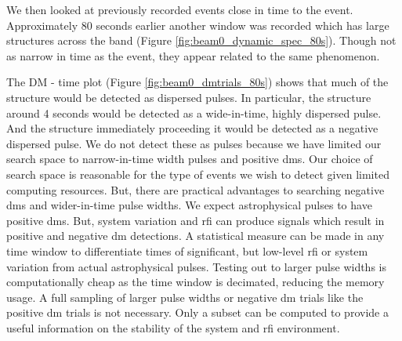 \documentclass[a4paper,fleqn,usenatbib]{mnras}
\begin{document}
We then looked at previously recorded events close in time to the event.
Approximately 80 seconds earlier another window was recorded which has large
structures across the band (Figure \ref{fig:beam0_dynamic_spec_80s}). Though not
as narrow in time as the event, they appear related to the same phenomenon.

The DM - time plot (Figure \ref{fig:beam0_dmtrials_80s}) shows that much of the
structure would be detected as dispersed pulses.  In particular, the structure
around 4 seconds would be detected as a wide-in-time, highly dispersed pulse.
And the structure immediately proceeding it would be detected as a negative
dispersed pulse.  We do not detect these as pulses because we have limited our
search space to narrow-in-time width pulses and positive \glspl{dm}. Our choice
of search space is reasonable for the type of events we wish to detect given
limited computing resources. But, there are practical advantages to searching
negative \glspl{dm} and wider-in-time pulse widths. We expect astrophysical
pulses to have positive \glspl{dm}. But, system variation and \gls{rfi} can
produce signals which result in positive and negative \gls{dm} detections.  A
statistical measure can be made in any time window to differentiate times of
significant, but low-level \gls{rfi} or system variation from actual
astrophysical pulses. Testing out to larger pulse widths is computationally
cheap as the time window is decimated, reducing the memory usage. A full sampling
of larger pulse widths or negative \gls{dm} trials like the positive \gls{dm}
trials is not necessary. Only a subset can be computed to provide a useful
information on the stability of the system and \gls{rfi} environment.
\end{document}
